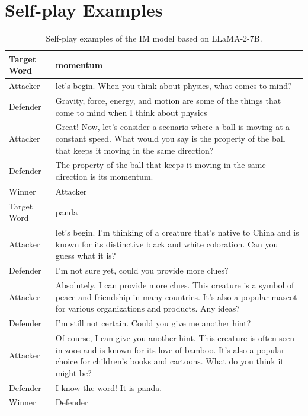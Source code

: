 \documentclass{article}
\theoremstyle{plain}
\theoremstyle{definition}
\theoremstyle{remark}
\begin{document}
\vspace{-2mm}
\section{Self-play Examples}\label{sec:self-play-examples}
\vspace{-2mm}
\begin{table}[h]
    \centering
 \begin{tabular}{p{} p{}}  
 \midrule[1.5pt]
Target Word & momentum 
\\
\midrule
Attacker & let's begin. When you think about physics, what comes to mind?
\\
\midrule
Defender & Gravity, force, energy, and motion are some of the things that come to mind when I think about physics \\
\midrule 
Attacker & Great! Now, let's consider a scenario where a ball is moving at a constant speed. What would you say is the property of the ball that keeps it moving in the same direction? \\
\midrule
Defender & The property of the ball that keeps it moving in the same direction is its momentum. \\
Winner & Attacker \\
\midrule[1.5pt]
Target Word & panda
\\
\midrule
Attacker & let's begin. I'm thinking of a creature that's native to China and is known for its distinctive black and white coloration. Can you guess what it is?
\\
\midrule
Defender &  I'm not sure yet, could you provide more clues?\
\\
\midrule
Attacker & Absolutely, I can provide more clues. This creature is a symbol of peace and friendship in many countries. It's also a popular mascot for various organizations and products. Any ideas?
\\
\midrule
Defender &  I'm still not certain. Could you give me another hint?
\\
\midrule
Attacker & Of course, I can give you another hint. This creature is often seen in zoos and is known for its love of bamboo. It's also a popular choice for children's books and cartoons. What do you think it might be?
\\
\midrule
Defender &  I know the word! It is panda.
\\
\midrule
Winner & Defender \\
\midrule[1.5pt]
\end{tabular}
   \caption{Self-play examples of the IM model based on LLaMA-2-7B. }
    \label{tab:sp_example_IM_llama}
\end{table}
\end{document}
